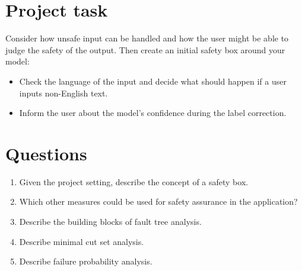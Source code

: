 

\newcommand{\dozenten}{Prof.~Dr.~Steffen Herbold}
\newcommand{\vorlesung}{Principles of AI Engineering}
\newcommand{\docauthor}{Lukas Schulte}
\newcommand{\semester}{}
\newcommand{\blattnummer}{8}
\newcommand{\bistermin}{}



\section*{Project task}

Consider how unsafe input can be handled and how the user might be able to judge the safety of the output. Then create an initial safety box around your model:

\begin{itemize}
      \item
            Check the language of the input and decide what should happen if a user inputs non-English text.
      \item
            Inform the user about the model's confidence during the label correction.
\end{itemize}

\section*{Questions}

\begin{enumerate}
      \item
            Given the project setting, describe the concept of a safety box.
      \item
            Which other measures could be used for safety assurance in the application?
      \item
            Describe the building blocks of fault tree analysis.
      \item
            Describe minimal cut set analysis.
      \item
            Describe failure probability analysis.
\end{enumerate}



